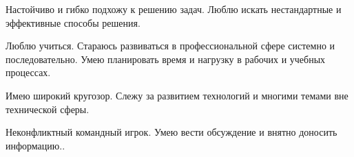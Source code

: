 

\begin{cventries}
  \cventry
    {Настойчиво и гибко подхожу к решению задач. Люблю искать нестандартные и эффективные способы решения.} %
    {} %
    {} %
    {} %
    {}

    \cventry
    {Люблю учиться. Стараюсь развиваться в профессиональной сфере системно и последовательно. Умею планировать время и нагрузку в рабочих и учебных процессах.} %
    {} %
    {} %
    {} %
    {}
    
    \cventry
    {Имею широкий кругозор. Слежу за развитием технологий и многими темами вне технической сферы.} %
    {} %
    {} %
    {} %
    {}
    
    \cventry
    {Неконфликтный командный игрок. Умею вести обсуждение и внятно доносить информацию..} %
    {} %
    {} %
    {} %
    {}
\end{cventries}
